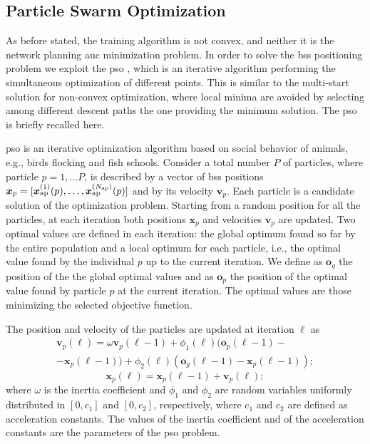 \documentclass[conference,final]{IEEEtran}
\begin{document}
\subsection{Particle Swarm Optimization}

As before stated, the training algorithm is not convex, and neither it is the network planning \ac{auc} minimization problem. In order to solve the \acp{bs} positioning problem we exploit the \ac{pso} \cite{Kennedy-11}, which is an iterative algorithm performing the simultaneous optimization of different points. This is similar to the multi-start solution for non-convex optimization, where local minima are avoided by selecting among different descent paths the one providing the minimum solution. The \ac{pso} is briefly recalled here.
 
\ac{pso} is an iterative optimization algorithm based on social behavior of animals, e.g., birds flocking and fish schools. Consider a total number $P$ of particles, where  particle $p=1, \ldots P$, is described by a vector of \acp{bs} positions $\bm{x}_p = [\bm{x}_{\rm ap}^{(1)}(p),\ldots, \bm{x}_{\rm ap}^{(N_{\rm ap})}(p)]$ and by its velocity $\bm{v}_p$.  Each particle is a candidate solution of the optimization problem. Starting from a random position for all the particles, at each iteration both  positions $\bm{x}_p$ and  velocities $\bm{v}_p$ are updated. Two optimal values are defined in each iteration: the global optimum found so far by the entire population and a local optimum for each particle, i.e., the optimal value found by the individual $p$ up to the current iteration. We define as $\bm{o}_g$ the position of the the global optimal values and as $\bm{o}_p$ the position of the optimal value found by particle $p$ at the current iteration. The optimal values are those minimizing the selected objective function.

The position and velocity of the particles are updated at iteration $\ell$ as \cite{Kennedy-11}
   \begin{equation}\label{eq: v up}
\begin{split}
  \bm{v}_p(\ell) = \omega \bm{v}_p(\ell-1)+\phi_1(\ell)(\bm{o}_p(\ell-1)-\\
  -\bm{x}_p(\ell-1))+\phi_2(\ell)(\bm{o}_g(\ell-1)-\bm{x}_p(\ell-1));
  \end{split}
  \end{equation}
  \begin{equation}\label{eq: p up}
  \bm{x}_p(\ell) = \bm{x}_p(\ell-1) + \bm{v}_p(\ell);
 \end{equation}
where $\omega$ is the inertia coefficient and $\phi_1$ and $\phi_2$ are random variables uniformly distributed in $[0,c_1]$ and $[0,c_2]$, respectively, where $c_1$ and $c_2$ are defined as acceleration constants. The values of the inertia coefficient and of the acceleration constants are the parameters of the \ac{pso} problem.
\end{document}
